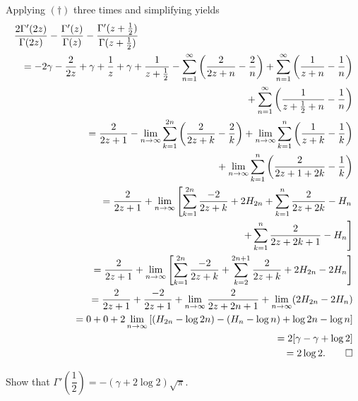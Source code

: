 \begin{solution}
Applying $(\dagger)$ three times and simplifying yields
\begin{eqnarray*}
\lefteqn{\dfrac{2 \Gamma'(2z)}{\Gamma(2z)} - \dfrac{\Gamma'(z)}{\Gamma(z)} - \dfrac{\Gamma'(z+\frac{1}{2})}{\Gamma(z+\frac{1}{2})}} \\
& &= -2 \gamma - \dfrac{2}{2z} + \gamma + \dfrac{1}{z} + \gamma + \dfrac{1}{z+\frac{1}{2}} - \displaystyle\sum_{n=1}^{\infty} \left( \dfrac{2}{2z+n} - \dfrac{2}{n} \right) + \displaystyle\sum_{n=1}^{\infty} \left( \dfrac{1}{z+n} - \dfrac{1}{n} \right) \\
& & \phantom{=}+ \displaystyle\sum_{n=1}^{\infty} \left( \dfrac{1}{z+\frac{1}{2}+n} - \dfrac{1}{n} \right) \\
& &= \dfrac{2}{2z+1} - \displaystyle\lim_{n \rightarrow \infty} \displaystyle\sum_{k=1}^{2n} \left( \dfrac{2}{2z+k} - \dfrac{2}{k} \right) + \displaystyle\lim_{n \rightarrow \infty} \displaystyle\sum_{k=1}^n \left( \dfrac{1}{z+k} - \dfrac{1}{k} \right) \\
& & \phantom{=}+ \displaystyle\lim_{n \rightarrow \infty} \displaystyle\sum_{k=1}^n \left( \dfrac{2}{2z+1+2k} - \dfrac{1}{k} \right) \\
& &= \dfrac{2}{2z+1} + \displaystyle\lim_{n \rightarrow \infty} \left[ \displaystyle\sum_{k=1}^{2n} \dfrac{-2}{2z+k} + 2 H_{2n} + \displaystyle\sum_{k=1}^n \dfrac{2}{2z+2k} - H_n \right. \\
& & \phantom{=} \left. + \displaystyle\sum_{k=1}^n \dfrac{2}{2z+2k+1} - H_n \right] \\
& &= \dfrac{2}{2z+1} + \displaystyle\lim_{n \rightarrow \infty} \left[ \displaystyle\sum_{k=1}^{2n} \dfrac{-2}{2z+k} + \displaystyle\sum_{k=2}^{2n+1} \dfrac{2}{2z+k} + 2 H_{2n} - 2 H_n \right] \\
& &= \dfrac{2}{2z+1} + \dfrac{-2}{2z+1} + \displaystyle\lim_{n \rightarrow \infty} \dfrac{2}{2z+2n+1} + \displaystyle\lim_{n \rightarrow \infty} (2 H_{2n} - 2 H_n) \\
& &= 0 + 0 + 2 \displaystyle\lim_{n \rightarrow \infty} \left[ (H_{2n}- \log 2n) - (H_n - \log n) + \log 2n - \log n \right] \\
& &= 2 [ \gamma - \gamma + \log 2 ] \\
& &= 2 \log 2. \qed
\end{eqnarray*}
\end{solution}
\begin{problem}\label{problem2chapter2}
Show that $\Gamma' \left(\dfrac{1}{2} \right) = -(\gamma + 2 \log 2) \sqrt{\pi}$.
\end{problem}
